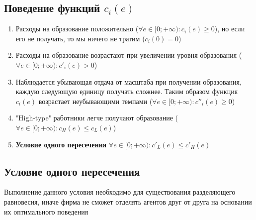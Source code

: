 \subsection{Поведение функций $c_i(e)$}
\begin{enumerate}
    \item Расходы на образование положительно ($\forall e\in [0;+\infty) : c_i(e)\geq0$), но если его не получать, то мы ничего не тратим ($c_i(0)=0$)
    \item Расходы на образование возрастают при увеличении уровня образования ($\forall e\in [0;+\infty) : c'_i(e)>0$)
    \item Наблюдается убывающая отдача от масштаба при получении образования, каждую следующую единицу получать сложнее. Таким образом функция $c_i(e)$ возрастает неубывающими темпами ($\forall e\in [0;+\infty) : c''_i(e)\geq0$)
    \item "High-type" работники легче получают образование ($\forall e\in [0;+\infty) : c_H(e)\leq c_L(e)$)
    \item \textbf{Условие одного пересечения} $\forall e\in [0;+\infty) : c'_L(e)\leq c'_H(e)$
\end{enumerate}

\subsection{Условие одного пересечения}
\indent\setlength{\parindent}{1em}Выполнение данного условия необходимо для существования разделяющего равновесия, иначе фирма не сможет отделять агентов друг от друга на основании их оптимального поведения
\smallskip
\begin{center}
\end{center}

